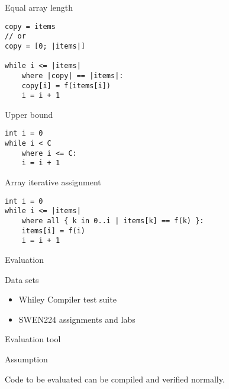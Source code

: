 \begin{frame}[fragile]{Equal array length}

\begin{verbatim}
copy = items
// or
copy = [0; |items|]

while i <= |items|
    where |copy| == |items|:
    copy[i] = f(items[i])
    i = i + 1
\end{verbatim}

\end{frame}

\begin{frame}[fragile]{Upper bound}

\begin{verbatim}
int i = 0
while i < C
    where i <= C:
    i = i + 1
\end{verbatim}

\end{frame}

\begin{frame}[fragile]{Array iterative assignment}

\begin{verbatim}
int i = 0
while i <= |items|
    where all { k in 0..i | items[k] == f(k) }:
    items[i] = f(i)
    i = i + 1
\end{verbatim}

\end{frame}

\begin{frame}{Evaluation}

\begin{block}{Data sets}

\begin{itemize}
\item
  Whiley Compiler test suite
\item
  SWEN224 assignments and labs
\end{itemize}

\end{block}

\end{frame}

\begin{frame}{Evaluation tool}

\begin{block}{Assumption}

Code to be evaluated can be compiled and verified normally.

\end{block}

\end{frame}

